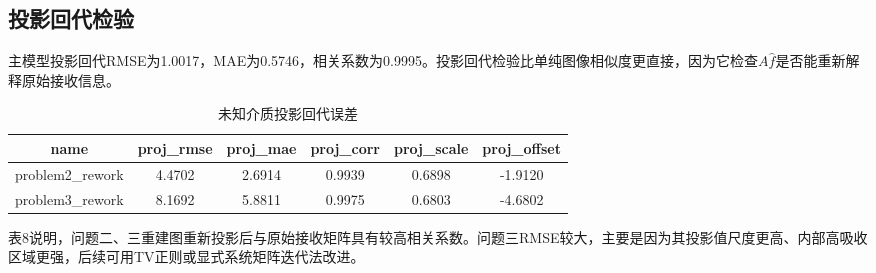 \documentclass[UTF8,a4paper,12pt]{ctexart}
\begin{document}
\subsection{投影回代检验}
\begin{table}[H]\centering\caption{附件2模板投影回代误差}\end{table}
主模型投影回代RMSE为1.0017，MAE为0.5746，相关系数为0.9995。投影回代检验比单纯图像相似度更直接，因为它检查\(A\hat f\)是否能重新解释原始接收信息。

\begin{table}[H]\centering\caption{未知介质投影回代误差}\begin{tabular}{cccccc}
\toprule
name & proj\_rmse & proj\_mae & proj\_corr & proj\_scale & proj\_offset \\
\midrule
problem2\_rework & 4.4702 & 2.6914 & 0.9939 & 0.6898 & -1.9120 \\
problem3\_rework & 8.1692 & 5.8811 & 0.9975 & 0.6803 & -4.6802 \\
\bottomrule
\end{tabular}\end{table}
表8说明，问题二、三重建图重新投影后与原始接收矩阵具有较高相关系数。问题三RMSE较大，主要是因为其投影值尺度更高、内部高吸收区域更强，后续可用TV正则或显式系统矩阵迭代法改进。
\end{document}
